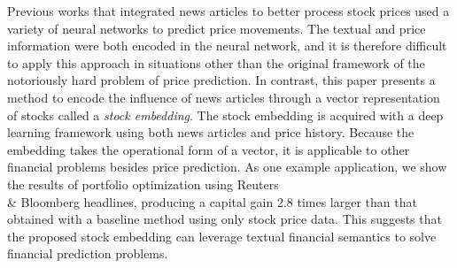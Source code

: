 Previous works that integrated news articles to better process stock prices used a variety of neural networks to predict price movements. The textual and price information were both encoded in the neural network, and it is therefore difficult to apply this approach in situations other than the original framework of the notoriously hard problem of price prediction. In contrast, this paper presents a method to encode the influence of news articles through a vector representation of stocks called a {\em stock embedding}. The stock embedding is acquired with a deep learning framework using both news articles and price history. Because the embedding takes the operational form of a vector, it is applicable to other financial problems besides price prediction. As one example application, we show the results of portfolio optimization using Reuters \\& Bloomberg headlines, producing a capital gain 2.8 times larger than that obtained with a baseline method using only stock price data. This suggests that the proposed stock embedding can leverage textual financial semantics to solve financial prediction problems.
